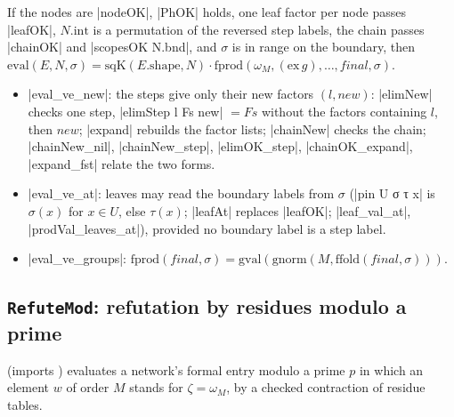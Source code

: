 \begin{theorem}
If the nodes are \lean|nodeOK|, \lean|PhOK| holds, one leaf factor per node passes \lean|leafOK|,
$N.\mathrm{int}$ is a permutation of the reversed step labels, the chain passes \lean|chainOK| and
\lean|scopesOK N.bnd|, and $\sigma$ is in range on the boundary, then
$\mathrm{eval}(E,N,\sigma)=\mathrm{sqK}(E.\mathrm{shape},N)\cdot\mathrm{fprod}(\omega_M,(\mathrm{ex}\,g),\ldots,final,\sigma)$.
\begin{itemize}
\item \lean|eval_ve_new|: the steps give only their new factors $(l,new)$: \lean|elimNew| checks one
  step, \lean|elimStep l Fs new| $=Fs$ without the factors containing $l$, then $new$;
  \lean|expand| rebuilds the factor lists; \lean|chainNew| checks the chain; \lean|chainNew_nil|,
  \lean|chainNew_step|, \lean|elimOK_step|, \lean|chainOK_expand|, \lean|expand_fst| relate the two
  forms.
\item \lean|eval_ve_at|: leaves may read the boundary labels from $\sigma$ (\leanLLone|pin U σ τ x| is
  $\sigma(x)$ for $x\in U$, else $\tau(x)$; \lean|leafAt| replaces \lean|leafOK|; \lean|leaf_val_at|,
  \lean|prodVal_leaves_at|), provided no boundary label is a step label.
\item \lean|eval_ve_groups|: $\mathrm{fprod}(final,\sigma)=\mathrm{gval}(\mathrm{gnorm}(M,\mathrm{ffold}(final,\sigma)))$.
\end{itemize}
\end{theorem}

\subsection{\texttt{RefuteMod}: refutation by residues modulo a prime}\label{sec:lean-core-refutemod}

 (imports ) evaluates a network's formal entry modulo a prime $p$ in which an element $w$ of order $M$ stands for $\zeta=\omega_M$, by a checked contraction of residue tables.

